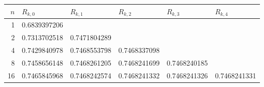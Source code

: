 \begin{tabular}{rlllll}
\toprule
$n$ & $R_{k,0}$ & $R_{k,1}$ & $R_{k,2}$ & $R_{k,3}$ & $R_{k,4}$ \\
\midrule
1 & 0.6839397206 &  &  &  &  \\
2 & 0.7313702518 & 0.7471804289 &  &  &  \\
4 & 0.7429840978 & 0.7468553798 & 0.7468337098 &  &  \\
8 & 0.7458656148 & 0.7468261205 & 0.7468241699 & 0.7468240185 &  \\
16 & 0.7465845968 & 0.7468242574 & 0.7468241332 & 0.7468241326 & 0.7468241331 \\
\bottomrule
\end{tabular}
